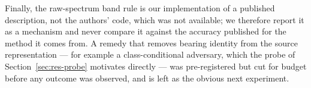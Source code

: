 Finally, the raw-spectrum band rule is our implementation of a published description, not the authors' code, which was not
available; we therefore report it as a mechanism and never compare it against the accuracy published for the method it comes
from. A remedy that removes bearing identity from the source representation --- for example a class-conditional adversary,
which the probe of Section~\ref{sec:res-probe} motivates directly --- was pre-registered but cut for budget before any
outcome was observed, and is left as the obvious next experiment.
